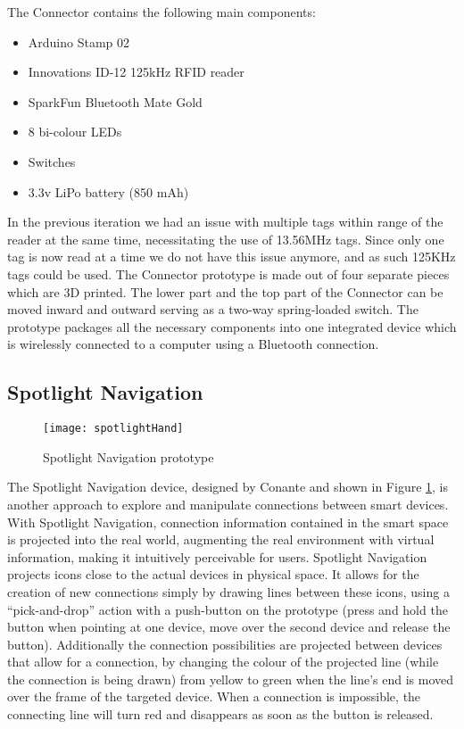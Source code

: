 The Connector contains the following main components:

\begin{itemize}
\item Arduino Stamp 02
\item Innovations ID-12 125kHz RFID reader
\item SparkFun Bluetooth Mate Gold
\item 8 bi-colour LEDs
\item Switches
\item 3.3v LiPo battery (850 mAh)
\end{itemize}

In the previous iteration we had an issue with multiple tags within range of the reader at the same time, necessitating the use of 13.56MHz tags. Since only one tag is now read at a time we do not have this issue anymore, and as such 125KHz tags could be used. The Connector prototype is made out of four separate pieces which are 3D printed. The lower part and the top part of the Connector can be moved inward and outward serving as a two-way spring-loaded switch. The prototype packages all the necessary components into one integrated device which is wirelessly connected to a computer using a Bluetooth connection. 


\subsection{Spotlight Navigation}\label{SpotlightNavigation}

\begin{figure}
\centering
\texttt{[image: spotlightHand]}
\caption{Spotlight Navigation prototype}
\label{projector}
\end{figure}

The Spotlight Navigation device, designed by Conante and shown in Figure \ref{projector}, is another approach to explore and manipulate connections between smart devices. With Spotlight Navigation, connection information contained in the smart space is projected into the real world, augmenting the real environment with virtual information, making it intuitively perceivable for users. Spotlight Navigation projects icons close to the actual devices in physical space. It allows for the creation of new connections simply by drawing lines between these icons, using a ``pick-and-drop'' action with a push-button on the prototype (press and hold the button when pointing at one device, move over the second device and release the button). Additionally the connection possibilities are projected between devices that allow for a connection, by changing the colour of the projected line (while the connection is being drawn) from yellow to green when the line's end is moved over the frame of the targeted device. When a connection is impossible, the connecting line will turn red and disappears as soon as the button is released.

